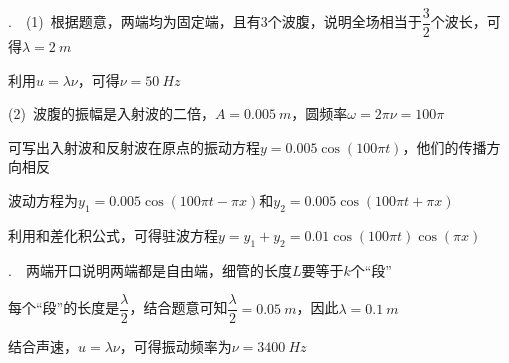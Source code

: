 \noindent\hdashrule{\textwidth}{1pt}{1pt}

.~~(1)~根据题意，两端均为固定端，且有3个波腹，说明全场相当于$\dfrac{3}{2}$个波长，可得$\lambda=\SI{2}{m}$

利用$u=\lambda \nu$，可得$\nu=\SI{50}{Hz}$

(2)~波腹的振幅是入射波的二倍，$A=\SI{0.005}{m}$，圆频率$\omega=2\pi\nu=100\pi$

可写出入射波和反射波在原点的振动方程$y=0.005 \cos{(100\pi t)}$，他们的传播方向相反

波动方程为$y_1=0.005 \cos{(100\pi t-\pi x)}$和$y_2=0.005 \cos{(100\pi t+\pi x)}$

利用和差化积公式，可得驻波方程$y=y_1+y_2=0.01\cos(100\pi t)\cos(\pi x)$

\noindent\hdashrule{\textwidth}{1pt}{1pt}

.~~两端开口说明两端都是自由端，细管的长度$L$要等于$k$个“段”

每个“段”的长度是$\dfrac{\lambda}{2}$，结合题意可知$\dfrac{\lambda}{2}=\SI{0.05}{m}$，因此$\lambda=\SI{0.1}{m}$

结合声速，$u=\lambda \nu$，可得振动频率为$\nu=\SI{3400}{Hz}$

